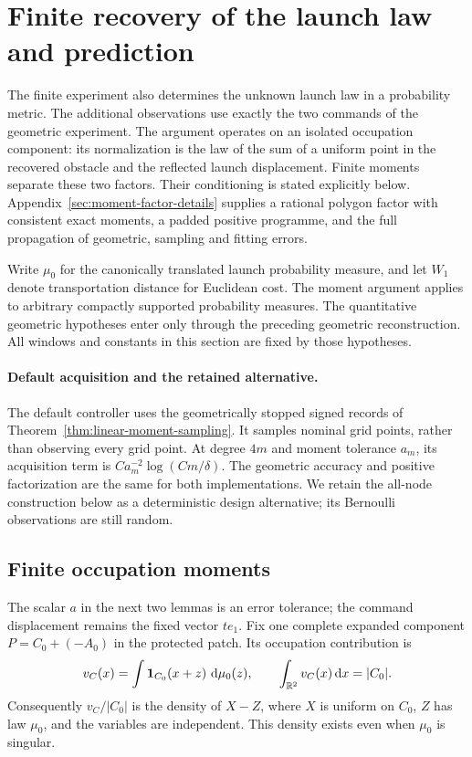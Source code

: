 \section{Finite recovery of the launch law and prediction}
\label{sec:two-field-finite-law}
The finite experiment also determines the unknown launch law in a
probability metric.  The additional observations use exactly the two
commands of the geometric experiment.  The argument operates on an
isolated occupation component: its normalization is the law of the
sum of a uniform point in the recovered obstacle and the reflected
launch displacement.  Finite moments separate these two factors.
Their conditioning is stated explicitly below.
Appendix~\ref{sec:moment-factor-details} supplies a rational polygon
factor with consistent exact moments, a padded positive programme,
and the full propagation of geometric, sampling and fitting errors.

Write $\mu_0$ for the canonically translated launch probability
measure, and let $W_1$ denote transportation distance for Euclidean
cost.  The moment argument applies to arbitrary compactly supported
probability measures.  The quantitative geometric hypotheses enter
only through the preceding geometric reconstruction.  All windows
and constants in this section are fixed by those hypotheses.

\paragraph{Default acquisition and the retained alternative.}
The default controller uses the geometrically stopped signed records
of Theorem~\ref{thm:linear-moment-sampling}. It samples nominal grid
points, rather than observing every grid point. At degree $4m$ and
moment tolerance $a_m$, its acquisition term is
$Ca_m^{-2}\log(Cm/\delta)$. The geometric accuracy and positive
factorization are the same for both implementations. We retain the
all-node construction below as a deterministic design alternative;
its Bernoulli observations are still random.

\subsection{Finite occupation moments}
The scalar $a$ in the next two lemmas is an error tolerance; the
command displacement remains the fixed vector $te_1$.
Fix one complete expanded component $P=C_0+(-A_0)$ in the protected
patch.  Its occupation contribution is
\begin{equation}\label{eq:two-field-component-occupation}
 v_C(x)=\int\mathbf 1_{C_0}(x+z)\,\,\mathrm d\mu_0(z),\qquad
 \int_{\mathbb R^2}v_C(x)\,\mathrm d x=|C_0|.
\end{equation}
Consequently $v_C/|C_0|$ is the density of $X-Z$, where $X$ is uniform
on $C_0$, $Z$ has law $\mu_0$, and the variables are independent.
This density exists even when $\mu_0$ is singular.

